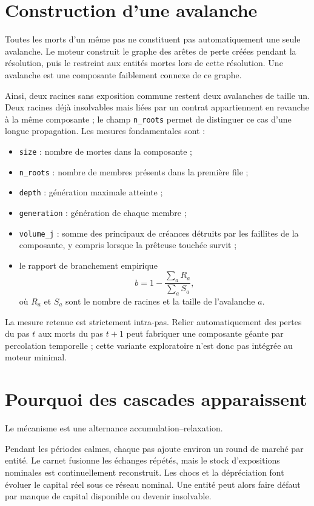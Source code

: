 \documentclass[11pt,a4paper]{article}
\newcommand{\code}[1]{\texttt{#1}}
\begin{document}
\section{Construction d'une avalanche}

Toutes les morts d'un même pas ne constituent pas automatiquement une seule
avalanche. Le moteur construit le graphe des arêtes de perte créées pendant
la résolution, puis le restreint aux entités mortes lors de cette résolution.
Une avalanche est une composante faiblement connexe de ce graphe.

Ainsi, deux racines sans exposition commune restent deux avalanches de taille
un. Deux racines déjà insolvables mais liées par un contrat appartiennent en
revanche à la même composante ; le champ \code{n\_roots} permet de distinguer
ce cas d'une longue propagation. Les mesures fondamentales sont :

\begin{itemize}
\item \code{size} : nombre de mortes dans la composante ;
\item \code{n\_roots} : nombre de membres présents dans la première file ;
\item \code{depth} : génération maximale atteinte ;
\item \code{generation} : génération de chaque membre ;
\item \code{volume\_j} : somme des principaux de créances détruits par les
faillites de la composante, y compris lorsque la prêteuse touchée survit ;
\item le rapport de branchement empirique
\[
b=1-\frac{\sum_a R_a}{\sum_a S_a},
\]
où $R_a$ et $S_a$ sont le nombre de racines et la taille de l'avalanche $a$.
\end{itemize}

La mesure retenue est strictement intra-pas. Relier automatiquement des
pertes du pas $t$ aux morts du pas $t+1$ peut fabriquer une composante géante
par percolation temporelle ; cette variante exploratoire n'est donc pas
intégrée au moteur minimal.

\section{Pourquoi des cascades apparaissent}

Le mécanisme est une alternance accumulation--relaxation.

Pendant les périodes calmes, chaque pas ajoute environ un round de marché par
entité. Le carnet fusionne les échanges répétés, mais le stock d'expositions
nominales est continuellement reconstruit. Les chocs et la dépréciation font
évoluer le capital réel sous ce réseau nominal. Une entité peut alors faire
défaut par manque de capital disponible ou devenir insolvable.
\end{document}
